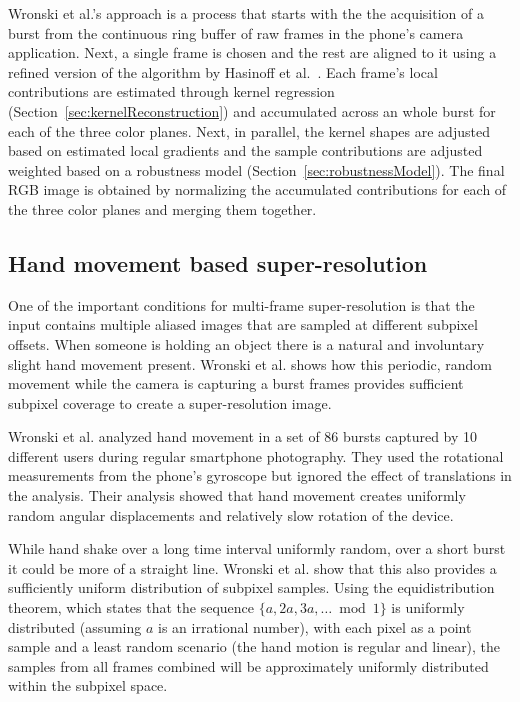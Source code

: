\documentclass{sig-alternate}
\begin{document}
Wronski et al.'s approach is a process that starts with the the acquisition of a burst from the continuous ring buffer of raw frames in the phone's camera application. Next, a single frame is chosen and the rest are aligned to it using a refined version of the algorithm by Hasinoff et al.~\cite{Hasinoff2016}.
Each frame's local contributions are estimated through kernel regression (Section~\ref{sec:kernelReconstruction}) and accumulated across an whole burst for each of the three color planes.
Next, in parallel, the kernel shapes are adjusted based on estimated local gradients and the sample contributions are adjusted weighted based on a robustness model (Section~\ref{sec:robustnessModel}).
The final RGB image is obtained by normalizing the accumulated contributions for each of the three color planes and merging them together.

\subsection{Hand movement based super-resolution}

One of the important conditions for multi-frame super-resolution is that the input contains multiple aliased images that are sampled at different subpixel offsets. When someone is holding an object there is a natural and involuntary slight hand movement present. Wronski et al. shows how this periodic, random movement while the camera is capturing a burst frames provides sufficient subpixel coverage to create a super-resolution image.

Wronski et al. analyzed hand movement in a set of 86 bursts captured by 10 different users during regular smartphone photography. They used the rotational measurements from the phone's gyroscope but ignored the effect of translations in the analysis. Their analysis showed that hand movement creates uniformly random angular displacements and relatively slow rotation of the device.


While hand shake over a long time interval uniformly random, over a short burst it could be more of a straight line.
Wronski et al. show that this also provides a sufficiently uniform distribution of subpixel samples.
Using the equidistribution theorem, which states that the sequence $\{a,2a,3a,\dotsc \bmod 1\}$ is uniformly distributed (assuming $a$ is an irrational number), with each pixel as a point sample and a least random scenario (the hand motion is regular and linear), the samples from all frames combined will be approximately uniformly distributed within the subpixel space.
\end{document}
